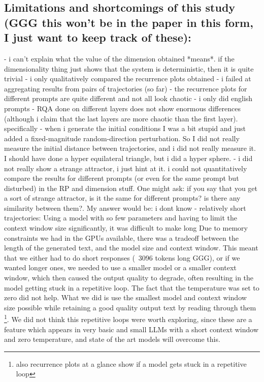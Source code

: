 \documentclass[a4paper,12pt]{article}
\begin{document}
\subsection{Limitations and shortcomings of this study (GGG this won't be in the paper in this form, I just want to keep track of these):}
- i can't explain what the value of the dimension obtained *means*. if the dimensionality thing just shows that the system is deterministic, then it is quite trivial
- i only qualitatively compared the recurrence plots obtained
- i failed at aggregating results from pairs of trajectories (so far)
- the recurrence plots for different prompts are quite different and not all look chaotic
- i only did english prompts
- RQA done on different layers does not show enormous differences (although i claim that the last layers are more chaotic than the first layer). specifically
- when i generate the initial conditions I was a bit stupid and just added a fixed-magnitude random-direction perturbation. So I did not really measure the initial distance between trajectories, and i did not really measure it. I should have done a hyper equilateral triangle, but i did a hyper sphere.
- i did not really show a strange attractor, i just hint at it. i could not quantitatively compare the results for different prompts (or even for the same prompt but disturbed) in the RP and dimension stuff. One might ask: if you say that you get a sort of strange attractor, is it the same for different prompts? is there any similarity between them?. My answer would be: i dont know
- relatively short trajectories:
Using a model with so few parameters and having to limit the context window size significantly, it was difficult to make long
Due to memory constraints we had in the GPUs available, there was a tradeoff between the length of the generated text, and the model size and context window. This meant that we either had to do short responses (~3096 tokens long GGG), or if we wanted longer ones, we needed to use a smaller model or a smaller context window, which then caused the output quality to degrade, often resulting in the model getting stuck in a repetitive loop. The fact that the temperature was set to zero did not help.
What we did is use the smallest model and context window size possible while retaining a good quality output text by reading through them \footnote{also recurrence plots at a glance show if a model gets stuck in a repetitive loop}. 
We did not think this repetitive loops were worth exploring, since these are a feature which appears in very basic and small LLMs with a short context window and zero temperature, and state of the art models will overcome this.
\end{document}
